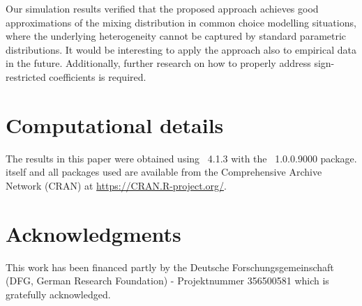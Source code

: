 \documentclass[article]{jss}
\begin{document}
Our simulation results verified that the proposed approach achieves good approximations of the mixing distribution in common choice modelling situations, where the underlying heterogeneity cannot be captured by standard parametric distributions. It would be interesting to apply the approach also to empirical data in the future. Additionally,
further research on how to properly address sign-restricted coefficients is required.


\section*{Computational details}

The results in this paper were obtained using
~4.1.3 with the
~1.0.0.9000 package.  itself
and all packages used are available from the Comprehensive
 Archive Network (CRAN) at \url{https://CRAN.R-project.org/}.


\section*{Acknowledgments}

This work has been financed partly by the Deutsche Forschungsgemeinschaft (DFG, German Research Foundation) - Projektnummer 356500581 which is gratefully acknowledged.


\end{document}
